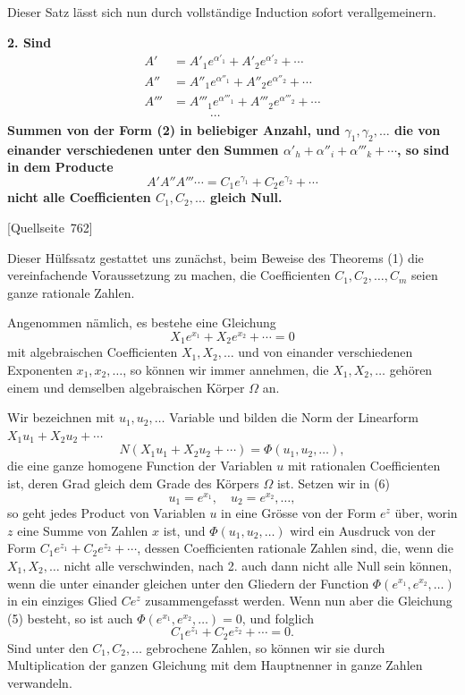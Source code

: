 \documentclass[11pt]{article}
\newcommand{\srcpage}[1]{\par\medskip\noindent\textsf{[Quellseite~#1]}\par\smallskip}
\begin{document}
Dieser Satz lässt sich nun durch vollständige Induction sofort verallgemeinern.

\textbf{2. Sind}
\[
\begin{aligned}
A'&=A'_1e^{\alpha'_1}+A'_2e^{\alpha'_2}+\cdots\\
A''&=A''_1e^{\alpha''_1}+A''_2e^{\alpha''_2}+\cdots\\
A'''&=A'''_1e^{\alpha'''_1}+A'''_2e^{\alpha'''_2}+\cdots\\
&\hspace{3em}\cdots
\end{aligned}
\]
\textbf{Summen von der Form (2) in beliebiger Anzahl, und $\gamma_1,\gamma_2,\ldots$ die von einander verschiedenen unter den Summen $\alpha'_h+\alpha''_i+\alpha'''_k+\cdots$, so sind in dem Producte}
\begin{equation}\tag{4}
A'A''A'''\cdots=C_1e^{\gamma_1}+C_2e^{\gamma_2}+\cdots
\end{equation}
\textbf{nicht alle Coefficienten $C_1,C_2,\ldots$ gleich Null.}

\srcpage{762}
Dieser Hülfssatz gestattet uns zunächst, beim Beweise des Theorems (1) die vereinfachende Voraussetzung zu machen, die Coefficienten $C_1,C_2,\ldots,C_m$ seien ganze rationale Zahlen.

Angenommen nämlich, es bestehe eine Gleichung
\begin{equation}\tag{5}
X_1e^{x_1}+X_2e^{x_2}+\cdots=0
\end{equation}
mit algebraischen Coefficienten $X_1,X_2,\ldots$ und von einander verschiedenen Exponenten $x_1,x_2,\ldots$, so können wir immer annehmen, die $X_1,X_2,\ldots$ gehören einem und demselben algebraischen Körper $\Omega$ an.

Wir bezeichnen mit $u_1,u_2,\ldots$ Variable und bilden die Norm der Linearform $X_1u_1+X_2u_2+\cdots$
\begin{equation}\tag{6}
N(X_1u_1+X_2u_2+\cdots)=\Phi(u_1,u_2,\ldots),
\end{equation}
die eine ganze homogene Function der Variablen $u$ mit rationalen Coefficienten ist, deren Grad gleich dem Grade des Körpers $\Omega$ ist. Setzen wir in (6)
\[
u_1=e^{x_1},\quad u_2=e^{x_2},\ldots,
\]
so geht jedes Product von Variablen $u$ in eine Grösse von der Form $e^z$ über, worin $z$ eine Summe von Zahlen $x$ ist, und $\Phi(u_1,u_2,\ldots)$ wird ein Ausdruck von der Form $C_1e^{z_1}+C_2e^{z_2}+\cdots$, dessen Coefficienten rationale Zahlen sind, die, wenn die $X_1,X_2,\ldots$ nicht alle verschwinden, nach 2. auch dann nicht alle Null sein können, wenn die unter einander gleichen unter den Gliedern der Function $\Phi(e^{x_1},e^{x_2},\ldots)$ in ein einziges Glied $Ce^z$ zusammengefasst werden. Wenn nun aber die Gleichung (5) besteht, so ist auch $\Phi(e^{x_1},e^{x_2},\ldots)=0$, und folglich
\[
C_1e^{z_1}+C_2e^{z_2}+\cdots=0.
\]
Sind unter den $C_1,C_2,\ldots$ gebrochene Zahlen, so können wir sie durch Multiplication der ganzen Gleichung mit dem Hauptnenner in ganze Zahlen verwandeln.
\end{document}
